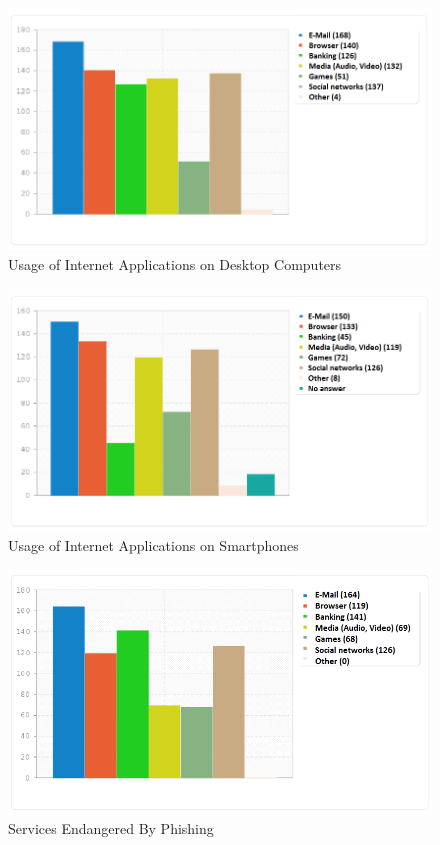 \begin{figure}[hHtbp]
\includegraphics[width=1.0\textwidth]{graphix/desktop_applications.png}%
\caption{Usage of Internet Applications on Desktop Computers}%
\label{fig:desktop_apps}%
\end{figure}

\begin{figure}[hHtbp]
\includegraphics[width=1.0\textwidth]{graphix/smartphone_applications.png}%
\caption{Usage of Internet Applications on Smartphones}%
\label{fig:smartphone_apps}%
\end{figure}

\begin{figure}[hHtbp]
\includegraphics[width=1.0\textwidth]{graphix/endangered_services.png}%
\caption{Services Endangered By Phishing}%
\label{fig:endangered_services}%
\end{figure}

